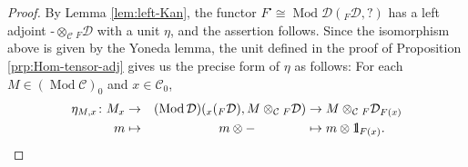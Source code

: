 \documentclass{surv-l}
\numberwithin{equation}{chapter}
\numberwithin{figure}{chapter}
\theoremstyle{plain}
\theoremstyle{definition}
\theoremstyle{remark}
\newcommand{\id}{1\kern-.25em{\text{{\rm l}}}}
\DeclareMathOperator{\Mod}{Mod}
\DeclareMathOperator{\blank}{-}
\begin{document}
\begin{proof}
By Lemma \ref{lem:left-Kan}, the functor $F^{\centerdot} \cong \Mod {\mathcal{D}}({}_F{\mathcal{D}}, ?)$
has a left adjoint $\blank \otimes_{{\mathcal{C}}}{}_F{\mathcal{D}}$ with a unit $\eta$, and the assertion follows.
Since the isomorphism above is given by the Yoneda lemma,
the unit defined in the proof of Proposition \ref{prp:Hom-tensor-adj} gives us
the precise form of $\eta$ as follows:
For each $M \in (\Mod {\mathcal{C}})_0$ and $x \in {\mathcal{C}}_0$,
\begin{alignat*}{3}
\eta_{M,x}\colon M_x &\to &(\Mod{\mathcal{D}})({}_x({}_F{\mathcal{D}}), M \otimes_{{\mathcal{C}}}{}_F{\mathcal{D}}) &\to M\otimes_{{\mathcal{C}}}{}_F{\mathcal{D}}_{F(x)}\\
m &\mapsto& m\otimes \blank\hspace{4em} &\mapsto m \otimes \id_{F(x)}.
\end{alignat*}
\end{proof}



\end{document}
